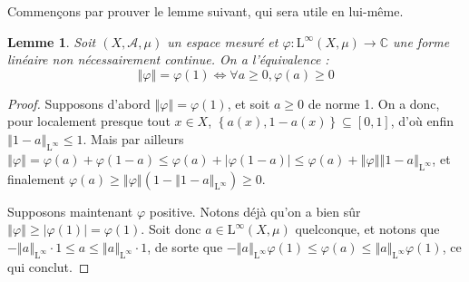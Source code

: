 \documentclass[a4paper,12pt]{article}
\newtheorem{lemma}[theorem]{Lemme}
\newcommand{\C}{\mathbb{C}}
\newcommand{\norm}[1]{\left\Vert #1\right\Vert}
\newcommand{\abs}[1]{\left\vert#1\right\vert}
\newcommand{\set}[1]{\left\{ #1 \right\}}
\renewcommand{\iff}{\Leftrightarrow}
\begin{document}
Commençons par prouver le lemme suivant, qui sera utile en lui-même.

\begin{lemma}\label{positive_iff_norm}
    Soit $(X, \mathcal{A}, \mu)$ un espace mesuré et $\varphi:\mathrm{L}^\infty(X,\mu)\to\C$ une forme linéaire \emph{non nécessairement continue}. 
    On a l'équivalence :
    \begin{equation*}
        \norm{\varphi} = \varphi(1) \iff \forall a \ge 0, \varphi(a) \geq 0
    \end{equation*}
\end{lemma}

\begin{proof}
    Supposons d'abord $\norm{\varphi} = \varphi(1)$, et soit $a\ge 0$ de norme 1. On a donc, pour localement presque tout $x\in X$, $\set{a(x), 1-a(x)}\subseteq[0,1]$,
    d'où enfin $\norm{1-a}_{\mathrm{L}^\infty}\le 1$. Mais par ailleurs $\norm{\varphi} = \varphi(a) + \varphi(1-a) \le \varphi(a) + \abs{\varphi(1-a)} \le \varphi(a) + \norm{\varphi}\norm{1 - a}_{\mathrm{L}^\infty}$, et finalement
    $\varphi(a)\ge \norm{\varphi}\left(1 - \norm{1-a}_{\mathrm{L}^\infty}\right) \ge0$. 

    Supposons maintenant $\varphi$ positive. Notons déjà qu'on a bien sûr $\norm{\varphi}\ge\abs{\varphi(1)}=\varphi(1)$. Soit donc $a\in\mathrm{L}^\infty(X,\mu)$ quelconque,
    et notons que $-\norm{a}_{\mathrm{L}^\infty}\cdot1\le a\le\norm{a}_{\mathrm{L}^\infty}\cdot1$, de sorte que $-\norm{a}_{\mathrm{L}^\infty}\varphi(1)\le\varphi(a)\le\norm{a}_{\mathrm{L}^\infty}\varphi(1)$, ce qui conclut.
\end{proof}
\end{document}
